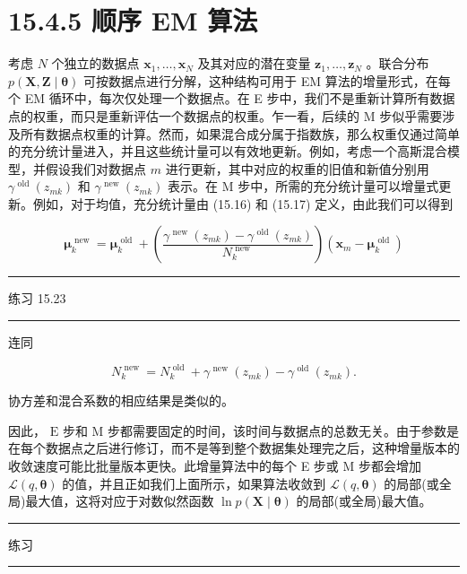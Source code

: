 \documentclass[10pt]{article}
\newcommand{\HRule}{\begin{center}\rule{0.9\linewidth}{0.2mm}\end{center}}
\begin{document}
\section*{15.4.5 顺序 EM 算法}

考虑 \(N\) 个独立的数据点 \({\mathbf{x}}_{1},\ldots ,{\mathbf{x}}_{N}\) 及其对应的潜在变量 \({\mathbf{z}}_{1},\ldots ,{\mathbf{z}}_{N}\) 。联合分布 \(p\left( {\mathbf{X},\mathbf{Z} \mid  \mathbf{\theta }}\right)\) 可按数据点进行分解，这种结构可用于 EM 算法的增量形式，在每个 EM 循环中，每次仅处理一个数据点。在 E 步中，我们不是重新计算所有数据点的权重，而只是重新评估一个数据点的权重。乍一看，后续的 M 步似乎需要涉及所有数据点权重的计算。然而，如果混合成分属于指数族，那么权重仅通过简单的充分统计量进入，并且这些统计量可以有效地更新。例如，考虑一个高斯混合模型，并假设我们对数据点 \(m\) 进行更新，其中对应的权重的旧值和新值分别用 \({\gamma }^{\text{ old }}\left( {z}_{mk}\right)\) 和 \({\gamma }^{\text{ new }}\left( {z}_{mk}\right)\) 表示。在 M 步中，所需的充分统计量可以增量式更新。例如，对于均值，充分统计量由 (15.16) 和 (15.17) 定义，由此我们可以得到

\[
{\mathbf{\mu }}_{k}^{\text{ new }} = {\mathbf{\mu }}_{k}^{\text{ old }} + \left( \frac{{\gamma }^{\text{ new }}\left( {z}_{mk}\right)  - {\gamma }^{\text{ old }}\left( {z}_{mk}\right) }{{N}_{k}^{\text{ new }}}\right) \left( {{\mathbf{x}}_{m} - {\mathbf{\mu }}_{k}^{\text{ old }}}\right)  \tag{15.60}
\]

\HRule

练习 15.23

\HRule

连同

\[
{N}_{k}^{\text{ new }} = {N}_{k}^{\text{ old }} + {\gamma }^{\text{ new }}\left( {z}_{mk}\right)  - {\gamma }^{\text{ old }}\left( {z}_{mk}\right) . \tag{15.61}
\]

协方差和混合系数的相应结果是类似的。

因此， \(\mathrm{E}\) 步和 \(\mathrm{M}\) 步都需要固定的时间，该时间与数据点的总数无关。由于参数是在每个数据点之后进行修订，而不是等到整个数据集处理完之后，这种增量版本的收敛速度可能比批量版本更快。此增量算法中的每个 E 步或 M 步都会增加 \(\mathcal{L}\left( {q,\mathbf{\theta }}\right)\) 的值，并且正如我们上面所示，如果算法收敛到 \(\mathcal{L}\left( {q,\mathbf{\theta }}\right)\) 的局部(或全局)最大值，这将对应于对数似然函数 \(\ln p\left( {\mathbf{X} \mid  \mathbf{\theta }}\right)\) 的局部(或全局)最大值。

\HRule

练习

\HRule
\end{document}
